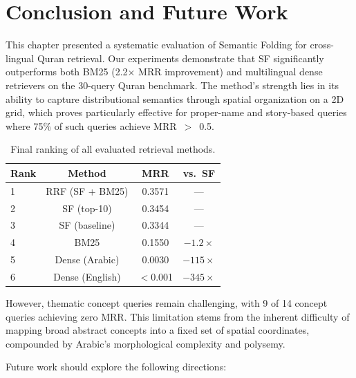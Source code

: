\documentclass[conference]{IEEEtran}
\begin{document}
\section{Conclusion and Future Work}

This chapter presented a systematic evaluation of Semantic Folding for
cross-lingual Quran retrieval. Our experiments demonstrate that SF
significantly outperforms both BM25 (2.2$\times$ MRR improvement) and
multilingual dense retrievers on the 30-query Quran benchmark. The
method's strength lies in its ability to capture distributional semantics
through spatial organization on a 2D grid, which proves particularly
effective for proper-name and story-based queries where 75\% of such
queries achieve MRR~$>$~0.5.

\begin{table}[t]
  \centering
  \caption{Final ranking of all evaluated retrieval methods.}
  \label{tab:ranking}
  \footnotesize
  \begin{tabular}{lccc}
    \toprule
    \textbf{Rank} & \textbf{Method} & \textbf{MRR} &
    \textbf{vs.~SF}\\
    \midrule
    1 & RRF (SF + BM25) & 0.3571 & --- \\
    2 & SF (top-10) & 0.3454 & --- \\
    3 & SF (baseline) & 0.3344 & --- \\
    4 & BM25 & 0.1550 & $-1.2\times$ \\
    5 & Dense (Arabic) & 0.0030 & $-115\times$ \\
    6 & Dense (English) & $<$0.001 & $-345\times$ \\
    \bottomrule
  \end{tabular}
\end{table}

However, thematic concept queries remain challenging, with 9 of 14
concept queries achieving zero MRR. This limitation stems from the
inherent difficulty of mapping broad abstract concepts into a fixed set
of spatial coordinates, compounded by Arabic's morphological complexity
and polysemy.

Future work should explore the following directions:
\end{document}
